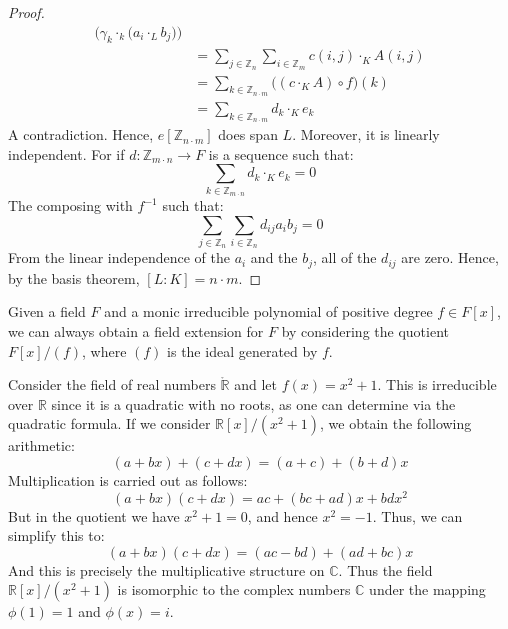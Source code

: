 \begin{proof}
\begin{align}
                \Big(\gamma_{k}\cdot_{k}\big(a_{i}\cdot_{L}b_{j}\big)\Big)\\
            &=\sum_{j\in\mathbb{Z}_{n}}\sum_{i\in\mathbb{Z}_{m}}
                c(i,j)\cdot_{K}A(i,j)\\
            &=\sum_{k\in\mathbb{Z}_{n\cdot{m}}}
                \big((c\cdot_{K}A)\circ{f}\big)(k)\\
            &=\sum_{k\in\mathbb{Z}_{n\cdot{m}}}d_{k}\cdot_{K}e_{k}
        \end{align}
        A contradiction. Hence, $e[\mathbb{Z}_{n\cdot{m}}]$ does span
        $L$. Moreover, it is linearly independent. For if
        $d:\mathbb{Z}_{m\cdot{n}}\rightarrow{F}$ is a sequence such that:
        \begin{equation}
            \sum_{k\in\mathbb{Z}_{m\cdot{n}}}d_{k}\cdot_{K}e_{k}=0
        \end{equation}
        The composing with $f^{\minus{1}}$ such that:
        \begin{equation}
            \sum_{j\in\mathbb{Z}_{n}}\sum_{i\in\mathbb{Z}_{n}}
                d_{ij}a_{i}b_{j}=0
        \end{equation}
        From the linear independence of the $a_{i}$ and the $b_{j}$,
        all of the $d_{ij}$ are zero. Hence, by the basis theorem,
        $[L:K]=n\cdot{m}$.
    \end{proof}
    Given a field $F$ and a monic irreducible polynomial of positive degree
    $f\in{F}[x]$, we can always obtain a field extension for $F$ by
    considering the quotient $F[x]/(f)$, where $(f)$ is the ideal generated
    by $f$.
    \begin{example}
        Consider the field of real numbers $\ring{\mathbb{R}}$ and let
        $f(x)=x^{2}+1$. This is irreducible over $\mathbb{R}$ since it is
        a quadratic with no roots, as one can determine via the quadratic
        formula. If we consider $\mathbb{R}[x]/(x^{2}+1)$, we obtain the
        following arithmetic:
        \begin{equation}
            (a+bx)+(c+dx)=(a+c)+(b+d)x
        \end{equation}
        Multiplication is carried out as follows:
        \begin{equation}
            (a+bx)(c+dx)=ac+(bc+ad)x+bdx^{2}
        \end{equation}
        But in the quotient we have $x^{2}+1=0$, and hence
        $x^{2}=\minus{1}$. Thus, we can simplify this to:
        \begin{equation}
            (a+bx)(c+dx)=(ac-bd)+(ad+bc)x
        \end{equation}
        And this is precisely the multiplicative structure on $\mathbb{C}$.
        Thus the field $\mathbb{R}[x]/(x^{2}+1)$ is isomorphic to the
        complex numbers $\mathbb{C}$ under the mapping
        $\phi(1)=1$ and $\phi(x)=i$.
    \end{example}
